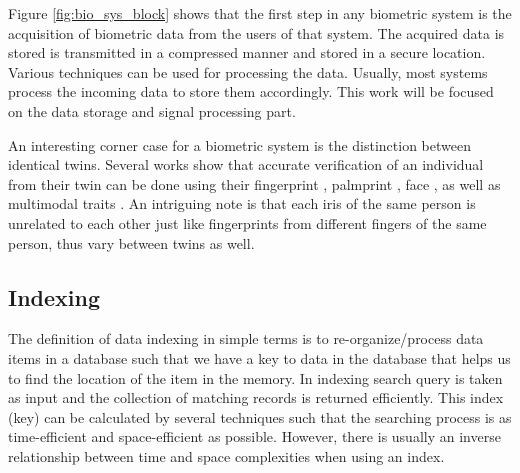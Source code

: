 Figure \ref{fig:bio_sys_block} shows that the first step in any biometric system is the acquisition of biometric data from the users of that system. The acquired data is stored is transmitted in a compressed manner and stored in a secure location. Various techniques can be used for processing the data. Usually, most systems process the incoming data to store them accordingly. This work will be focused on the data storage and signal processing part.

An interesting corner case for a biometric system is the distinction between identical twins. Several works show that accurate verification of an individual from their twin can be done using their fingerprint \cite{Jain2002}, palmprint \cite{Kong2006}, face \cite{Phillips2011}, as well as multimodal traits \cite{Sun2010}. An intriguing note is that each iris of the same person is unrelated to each other \cite{Wildes1997} just like fingerprints from different fingers of the same person, thus vary between twins as well.

\subsection{Indexing}

The definition of data indexing in simple terms is to re-organize/process data items in a database such that we have a key to data in the database
that helps us to find the location of the item in the memory. In indexing search query is taken as input and the collection of matching records is returned efficiently. This index (key) can be calculated by several techniques such that the searching process 
is as time-efficient and space-efficient as possible. However, there is usually an inverse relationship between time and space complexities when using an index.

